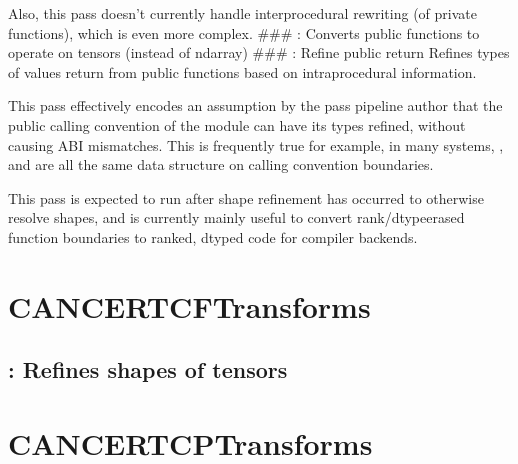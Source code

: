 \documentclass[letterpaper,10pt,english]{sphinxmanual}
\begin{document}
\sphinxAtStartPar
Also, this pass doesn’t currently handle interprocedural rewriting (of
private functions), which is even more complex. \#\#\#
: Converts public functions to
operate on tensors (instead of ndarray) \#\#\#
: Refine public return Refines types of
values return from public functions based on intraprocedural
information.

\sphinxAtStartPar
This pass effectively encodes an assumption by the pass pipeline author
that the public calling convention of the module can have its types
refined, without causing ABI mismatches. This is frequently true \textendash{} for
example, in many systems, ,  and
 are all the same data structure on
calling convention boundaries.

\sphinxAtStartPar
This pass is expected to run after shape refinement has occurred to
otherwise resolve shapes, and is currently mainly useful to convert
rank/dtype\sphinxhyphen{}erased function boundaries to ranked, dtyped code for
compiler backends.


\section{CANCERTCFTransforms}
\label{\detokenize{Pass_And_Transforms/index:cancertcftransforms}}



\subsection{: Refines shapes of tensors}
\label{\detokenize{Pass_And_Transforms/index:tcf-shape-refinement-refines-shapes-of-tensors}}

\section{CANCERTCPTransforms}
\label{\detokenize{Pass_And_Transforms/index:cancertcptransforms}}
\end{document}
